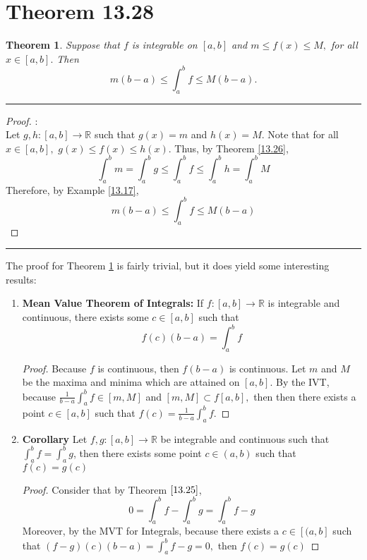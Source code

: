 \documentclass[openany, amssymb, psamsfonts]{amsart}
\newcommand{\bbR}{\mathbb{R}}
\newtheorem{thm}{Theorem}[section]
\theoremstyle{definition}
\numberwithin{equation}{section}
\begin{document}
\section*{Theorem 13.28}
\begin{thm}
\label{13.28}
	Suppose that $f$ is integrable on $[a, b]$ and $m\leq f(x)\leq M,$ for all $x\in [a,b].$ Then 
	\[
		m (b - a) \leq \int_{a}^{b} f \leq M(b - a).
	\]
\end{thm} 
\vspace{4pt}     \hrule   \vspace{4pt}\begin{proof}:\\
Let $g,h:[a,b]\to \bbR$ such that $g(x) = m$ and $h(x) = M$. Note that for all $x\in [a,b],$ $g(x) \leq f(x) \leq h(x).$ Thus, by Theorem \ref{13.26}, \[\int_a^b m = \int_a^b g \leq \int_a^bf \leq \int_a^b h = \int_a^b M\] Therefore, by Example \ref{13.17}, \[m(b-a)\leq \int_a^bf \leq M(b-a)\]
\end{proof} \vspace{4pt}     \hrule   \vspace{4pt}
    The proof for Theorem \ref{13.28} is fairly trivial, but it does yield some interesting results:
    \begin{enumerate}
        \item \textbf{Mean Value Theorem of Integrals:} If $f:[a,b] \to \bbR$ is integrable and continuous, there exists some $c\in [a,b]$ such that \[f(c)(b-a) = \int_a^bf\]
        \begin{proof}
            Because $f$ is continuous, then $f(b-a)$ is continuous. Let $m$ and $M$ be the maxima and minima which are attained on $[a,b].$ By the IVT, because $\frac{1}{b-a}\int_a^bf \in [m,M]$ and $[m,M] \subset f[a,b],$ then then there exists a point $c \in [a,b]$ such that $f(c) = \frac{1}{b-a}\int_a^bf.$
        \end{proof}
        \item \textbf{Corollary} Let $f,g: [a,b]\to \bbR$ be integrable and continuous such that $\int_a^bf= \int_a^bg$, then there exists some point $c\in (a,b)$ such that $f(c) = g(c)$
        \begin{proof}
            Consider that by Theorem $\ref{13.25}$, \[0 = \int_a^b f - \int_a^b g = \int_a^bf-g\] Moreover, by the MVT for Integrals, because there exists a $c\in[(a,b]$ such that $(f-g)(c)(b-a) = \int_a^b f - g = 0,$ then $f(c) = g(c)$
        \end{proof}
    \end{enumerate}
\end{document}

